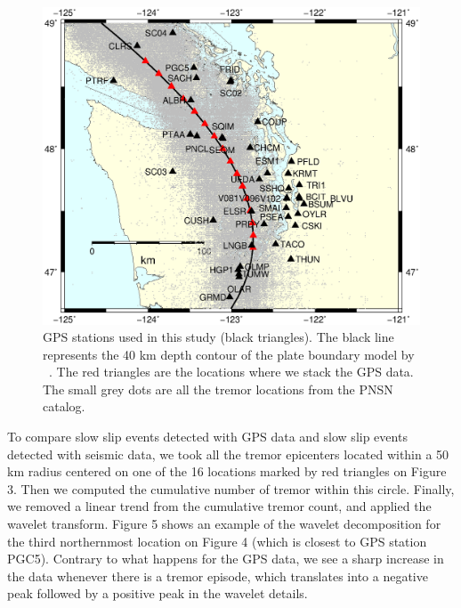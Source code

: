 \documentclass[draft]{agujournal2018}
\begin{document}
\begin{figure}
\noindent\includegraphics[width=\textwidth, trim={0cm 0cm 0cm 0cm},clip]{figures/map_GPS_stations.eps}
\caption{GPS stations used in this study (black triangles). The black line represents the 40 km depth contour of the plate boundary model by ~\citet{PRE_2003}. The red triangles are the locations where we stack the GPS data. The small grey dots are all the tremor locations from the PNSN catalog.}
\label{pngfiguresample}
\end{figure}

To compare slow slip events detected with GPS data and slow slip events detected with seismic data, we took all the tremor epicenters located within a 50 km radius centered on one of the 16 locations marked by red triangles on Figure 3. Then we computed the cumulative number of tremor within this circle. Finally, we removed a linear trend from the cumulative tremor count, and applied the wavelet transform. Figure 5 shows an example of the wavelet decomposition for the third northernmost location on Figure 4 (which is closest to GPS station PGC5). Contrary to what happens for the GPS data, we see a sharp increase in the data whenever there is a tremor episode, which translates into a negative peak followed by a positive peak in the wavelet details.
\end{document}
